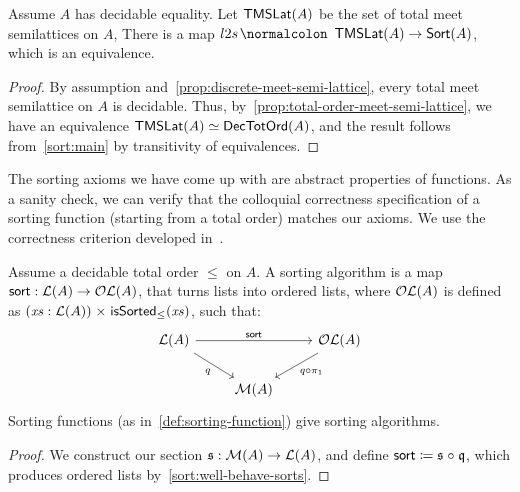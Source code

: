 \begin{corollary}
    \label{sort:lattice}
    Assume $A$ has decidable equality.
    Let $\operatorname{\mathsf{TMSLat}}(A)$ be the set of total meet semilattices on $A$,
    There is a map $l2s \colon \term{TMSLat}(A) \to \term{Sort}(A)$,
    which is an equivalence.
\end{corollary}
\begin{proof}
    By assumption and~\cref{prop:discrete-meet-semi-lattice}, every total meet semilattice on $A$ is decidable.
    Thus, by~\cref{prop:total-order-meet-semi-lattice}, we have an equivalence
    $\operatorname{\mathsf{TMSLat}}(A) \simeq \operatorname{\mathsf{DecTotOrd}}(A)$, and the result follows from~\cref{sort:main}
    by transitivity of equivalences.
\end{proof}
%
The sorting axioms we have come up with are abstract properties of functions.
%
As a sanity check, we can verify that the colloquial correctness specification of a sorting function (starting from a
total order) matches our axioms. We use the correctness criterion developed in~\cite{alexandruIntrinsicallyCorrectSorting2023}.
%
\begin{proposition}
    \label{prop:sort-correctness}
    Assume a decidable total order $\leq$ on $A$.
    A sorting algorithm is a map $\operatorname{\mathsf{sort}} : {\mathcal{L}(A) \to \mathcal{OL}(A)}$,
    that turns lists into ordered lists,
    where $\mathcal{OL}(A)$ is defined as $\dsum{\xs : \LL(A)}{\isSorted_{\leq}(\xs)}$,
    such that:
    \[\begin{tikzcd}
            {\LL(A)} && {\OLL(A)} \\
            & {\MM(A)}
            \arrow["{\term{sort}}", from=1-1, to=1-3]
            \arrow["q"', from=1-1, to=2-2]
            \arrow["{q \comp \pi_1}", from=1-3, to=2-2]
        \end{tikzcd}\]
    Sorting functions (as in~\cref{def:sorting-function}) give sorting algorithms.
\end{proposition}
\begin{proof}
    We construct our section $\mathfrak{s}:\mathcal{M}(A) \to \mathcal{L}(A)$,
    and define $\operatorname{\mathsf{sort}} \mathrel{\coloneq} \mathfrak{s} \mathrel{\circ} \mathfrak{q}$,
    which produces ordered lists by~\cref{sort:well-behave-sorts}.
\end{proof}

